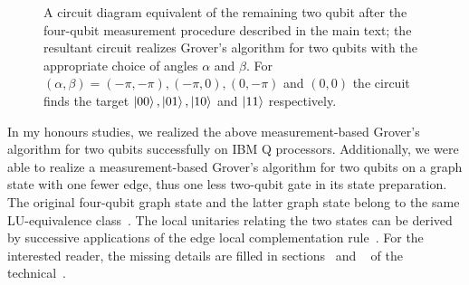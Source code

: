 \begin{figure}[h]
	\centering
	\caption[A circuit diagram equivalent of the remaining two qubit after the four-qubit measurement procedure descibed in the main text.]{A circuit diagram equivalent of the remaining two qubit after the four-qubit measurement procedure described in the main text; the resultant circuit realizes Grover's algorithm for two qubits with the appropriate choice of angles $\alpha$ and $\beta$. For ${(\alpha, \beta) = (-\pi,-\pi), (-\pi, 0), (0,-\pi)}$ and $(0,0)$ the circuit finds the target $\ket{00}, \ket{01}, \ket{10}$ and $\ket{11}$ respectively.}
\end{figure}

\clearpage
\noindent
In my honours studies, we realized the above measurement-based Grover's algorithm for two qubits successfully on IBM Q processors. Additionally, we were able to realize a measurement-based Grover's algorithm for two qubits on a graph state with one fewer edge, thus one less two-qubit gate in its state preparation. The original four-qubit graph state and the latter graph state belong to the same \acs{LU}-equivalence class~\cite{Hein_2004, Nest_2004}. The local unitaries relating the two states can be derived by successive applications of the edge local complementation rule~\cite{Hein_2004,Nest_2004}. For the interested reader, the missing details are filled in sections~ and ~ of the technical~.

